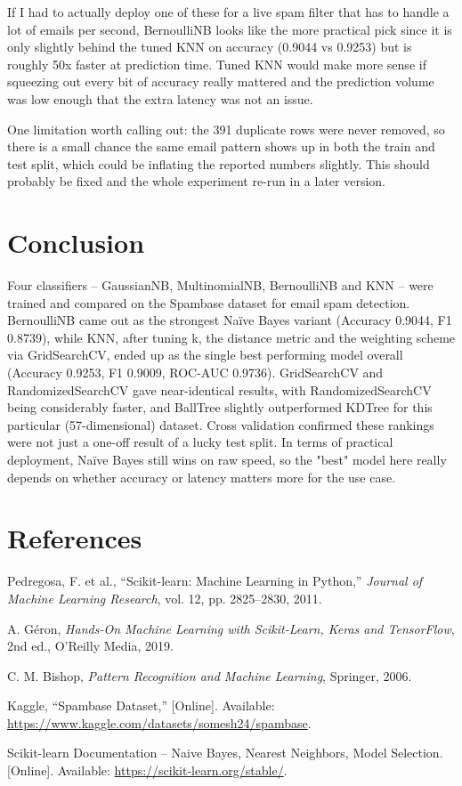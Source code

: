\documentclass[12pt,a4paper]{article}
\begin{document}
If I had to actually deploy one of these for a live spam filter that has to handle a lot of emails per second, BernoulliNB looks like the more practical pick since it is only slightly behind the tuned KNN on accuracy (0.9044 vs 0.9253) but is roughly 50x faster at prediction time. Tuned KNN would make more sense if squeezing out every bit of accuracy really mattered and the prediction volume was low enough that the extra latency was not an issue.

One limitation worth calling out: the 391 duplicate rows were never removed, so there is a small chance the same email pattern shows up in both the train and test split, which could be inflating the reported numbers slightly. This should probably be fixed and the whole experiment re-run in a later version.

\section{Conclusion}
Four classifiers -- GaussianNB, MultinomialNB, BernoulliNB and KNN -- were trained and compared on the Spambase dataset for email spam detection. BernoulliNB came out as the strongest Na\"ive Bayes variant (Accuracy 0.9044, F1 0.8739), while KNN, after tuning k, the distance metric and the weighting scheme via GridSearchCV, ended up as the single best performing model overall (Accuracy 0.9253, F1 0.9009, ROC-AUC 0.9736). GridSearchCV and RandomizedSearchCV gave near-identical results, with RandomizedSearchCV being considerably faster, and BallTree slightly outperformed KDTree for this particular (57-dimensional) dataset. Cross validation confirmed these rankings were not just a one-off result of a lucky test split. In terms of practical deployment, Na\"ive Bayes still wins on raw speed, so the "best" model here really depends on whether accuracy or latency matters more for the use case.

\section{References}
\begin{enumerate}[label={[\arabic*]}]
\item Pedregosa, F. et al., ``Scikit-learn: Machine Learning in Python,'' \textit{Journal of Machine Learning Research}, vol. 12, pp. 2825--2830, 2011.
\item A. G\'eron, \textit{Hands-On Machine Learning with Scikit-Learn, Keras and TensorFlow}, 2nd ed., O'Reilly Media, 2019.
\item C. M. Bishop, \textit{Pattern Recognition and Machine Learning}, Springer, 2006.
\item Kaggle, ``Spambase Dataset,'' [Online]. Available: \url{https://www.kaggle.com/datasets/somesh24/spambase}.
\item Scikit-learn Documentation -- Naive Bayes, Nearest Neighbors, Model Selection. [Online]. Available: \url{https://scikit-learn.org/stable/}.
\end{enumerate}
\end{document}
